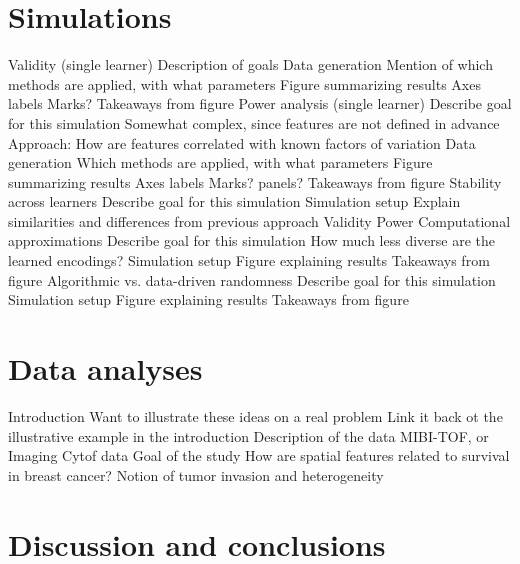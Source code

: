 \documentclass[11pt]{article}
\begin{document}
\section{Simulations}

\begin{outline}
  \1 Validity (single learner)
    \2 Description of goals
    \2 Data generation
    \2 Mention of which methods are applied, with what parameters
    \2 Figure summarizing results
      \3 Axes labels
      \3 Marks?
    \2 Takeaways from figure
  \1 Power analysis (single learner)
    \2 Describe goal for this simulation
    \2 Somewhat complex, since features are not defined in advance
    \2 Approach: How are features correlated with known factors of variation
    \2 Data generation
    \2 Which methods are applied, with what parameters
    \2 Figure summarizing results
      \3 Axes labels
      \3 Marks?
      \3 panels?
    \2 Takeaways from figure
  \1 Stability across learners
    \2 Describe goal for this simulation
    \2 Simulation setup
      \3 Explain similarities and differences from previous approach
      \3 Validity
      \3 Power
  \1 Computational approximations
    \2 Describe goal for this simulation
    \2 How much less diverse are the learned encodings?
    \2 Simulation setup
    \2 Figure explaining results
    \2 Takeaways from figure
  \1 Algorithmic vs. data-driven randomness
    \2 Describe goal for this simulation
    \2 Simulation setup
    \2 Figure explaining results
    \2 Takeaways from figure
\end{outline}

\section{Data analyses}

\begin{outline}
  \1 Introduction
    \2 Want to illustrate these ideas on a real problem
      \3 Link it back ot the illustrative example in the introduction
    \2 Description of the data
      \3 MIBI-TOF, or Imaging Cytof data
  \1 Goal of the study
    \2 How are spatial features related to survival in breast cancer?
    \2 Notion of tumor invasion and heterogeneity
\end{outline}

\section{Discussion and conclusions}
\end{document}

